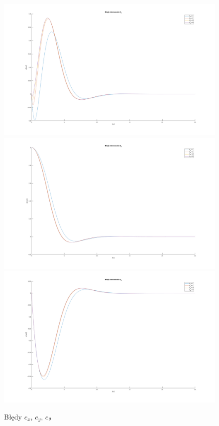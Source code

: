 \documentclass[12pt,a4paper]{article}
\begin{document}
  \begin{figure}[H]
    \centering
    \includegraphics[height=0.33\textheight]{figures/dyn_bledy_km_ex.png}
    \includegraphics[height=0.33\textheight]{figures/dyn_bledy_km_ey.png}
    \includegraphics[height=0.33\textheight]{figures/dyn_bledy_km_eo.png}
    \caption{Błędy $e_x$, $e_y$, $e_\theta$}
    \label{fig:9}
  \end{figure}
\end{document}
